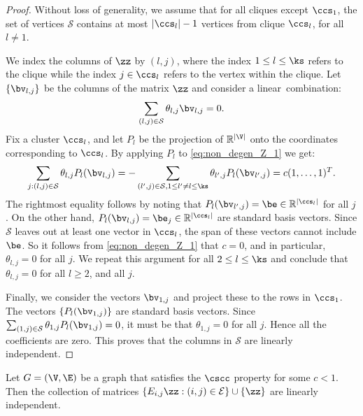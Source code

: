 \begin{proof} Without loss of generality, we assume that for all cliques except $ \ccs_1$, the set of vertices $\mathcal{S}$ contains at most $ |\ccs_{l}|-1$ vertices from clique $\ccs_{l}$, for all $l\ne 1$.

We index the columns of $\zz$ by $(l,j)$, where the index $1\leq l \leq \ks$ refers to the clique while the index $j\in \ccs_l$ refers to the vertex within the clique.  Let $\{\bv_{l,j}\}$ be the columns of the matrix $\zz$ and consider a linear~combination:
\begin{equation}\label{eq:non_degen_Z_1}
\sum_{(l,j) \in \mathcal{S}} \theta_{l,j} \bv_{l,j} = 0.
\end{equation}
Fix a cluster $\ccs_l$, and let $P_l$ be the projection of $\mathbb{R}^{|\V|}$ onto the coordinates corresponding to $\ccs_l$.  By applying $P_l$ to \eqref{eq:non_degen_Z_1} we get:
\begin{equation}\label{eq:non_degen_Z_2}
\sum_{j : (l,j)\in \mathcal{S}} \theta_{l,j} P_l(\bv_{l,j}) = - \sum_{(l',j) \in \mathcal{S}, 1\leq l' \neq l \leq \ks} \theta_{l',j} P_l(\bv_{l',j}) =  c (1,\ldots,1)^T.
\end{equation}
The rightmost equality follows by noting that $P_l(\bv_{l',j}) = \be \in \mathbb{R}^{|\ccs_l|}$ for all $j$.  On the other hand, $P_l(\bv_{l,j}) = \be_j  \in \mathbb{R}^{|\ccs_l|}$ are standard basis vectors.  Since $\mathcal{S}$ leaves out at least one vector in $\ccs_l$, the span of these vectors cannot include $\be$.  So it follows from \eqref{eq:non_degen_Z_1} that $c=0$, and in particular, $\theta_{l,j} = 0$ for all $j$.  We repeat this argument for all $2 \leq l \leq \ks$ and conclude that $\theta_{l,j} = 0$ for all $l \geq 2$, and all $j$.

Finally, we consider the vectors $\bv_{1,j}$ and project these to the rows in $\ccs_1$.  The vectors $\{P_l(\bv_{1,j})\}$ are standard basis vectors.  Since $\sum_{(1,j) \in \mathcal{S}} \theta_{1,j} P_l(\bv_{1,j}) = 0$, it must be that $\theta_{1,j} = 0$ for all $j$.  Hence all the coefficients are zero.  This proves that the columns in $\mathcal{S}$ are linearly independent.
\end{proof}


\begin{lemma} \label{thm:non_degen_alg} Let $G = (\V,\E)$ be a graph that satisfies the $\cscc$ property for some $c<1$.  Then the collection of matrices 
$
\{ E_{i,j} \zz : (i,j) \in \mathcal{E}\} \cup \{ \zz \}
$ 
are linearly independent.
\end{lemma}

